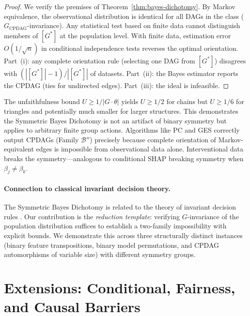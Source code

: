 \documentclass{jmlr}
\begin{document}
\begin{proof}
We verify the premises of Theorem~\ref{thm:bayes-dichotomy}. By Markov equivalence, the observational distribution is identical for all DAGs in the class ($G_{\text{CPDAG}}$-invariance). Any statistical test based on finite data cannot distinguish members of $[G^*]$ at the population level. With finite data, estimation error $O(1/\sqrt{n})$ in conditional independence tests reverses the optimal orientation. Part~(i): any complete orientation rule (selecting one DAG from $[G^*]$) disagrees with $(|[G^*]|-1)/|[G^*]|$ of datasets. Part~(ii): the Bayes estimator reports the CPDAG (ties for undirected edges). Part~(iii): the ideal is infeasible.
\end{proof}

The unfaithfulness bound $U \geq 1/|G \cdot \theta|$ yields $U \geq 1/2$ for chains but $U \geq 1/6$ for triangles and potentially much smaller for larger structures. This demonstrates the Symmetric Bayes Dichotomy is not an artifact of binary symmetry but applies to arbitrary finite group actions. Algorithms like PC and GES correctly output CPDAGs (Family $\mathcal{B}''$) precisely because complete orientation of Markov-equivalent edges is impossible from observational data alone. Interventional data breaks the symmetry---analogous to conditional SHAP breaking symmetry when $\beta_j \neq \beta_k$.

\paragraph{Connection to classical invariant decision theory.}
The Symmetric Bayes Dichotomy is related to the theory of invariant decision rules \citep{lehmann2005testing}. Our contribution is the \emph{reduction template}: verifying $G$-invariance of the population distribution suffices to establish a two-family impossibility with explicit bounds. We demonstrate this across three structurally distinct instances (binary feature transpositions, binary model permutations, and CPDAG automorphisms of variable size) with different symmetry groups.


\section{Extensions: Conditional, Fairness, and Causal Barriers}
\label{sec:extensions}
\end{document}
